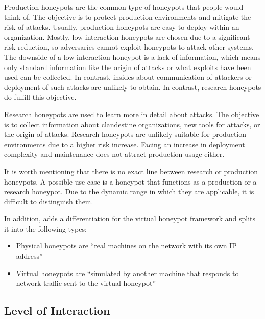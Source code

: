 Production honeypots are the common type of honeypots that people would think of.
The objective is to protect production environments and mitigate the risk of attacks.
Usually, production honeypots are easy to deploy within an organization.
Mostly, low-interaction honeypots are chosen due to a significant risk reduction, so adversaries cannot exploit honeypots to attack other systems.
The downside of a low-interaction honeypot is a lack of information, which means only standard information like the origin of attacks or what exploits have been used can be collected.
In contrast, insides about communication of attackers or deployment of such attacks are unlikely to obtain.
In contrast, research honeypots do fulfill this objective. \cite{Spitzner2003}

Research honeypots are used to learn more in detail about attacks.
The objective is to collect information about clandestine organizations, new tools for attacks, or the origin of attacks.
Research honeypots are unlikely suitable for production environments due to a higher risk increase.
Facing an increase in deployment complexity and maintenance does not attract production usage either. \cite{Spitzner2003}

It is worth mentioning that there is no exact line between research or production honeypots.
A possible use case is a honeypot that functions as a production or a research honeypot.
Due to the dynamic range in which they are applicable, it is difficult to distinguish them.

In addition, \citet{Provos2003} adds a differentiation for the virtual honeypot framework and splits it into the following types:

\begin{itemize}
    \item Physical honeypots are \enquote{real machines on the network with its own IP address} \cite{Provos2003}
    \item Virtual honeypots are \enquote{simulated by another machine that responds to network traffic sent to the virtual honeypot} \cite{Provos2003}
\end{itemize}

\subsection{Level of Interaction}
\label{subsec:interaction-honeypots}

